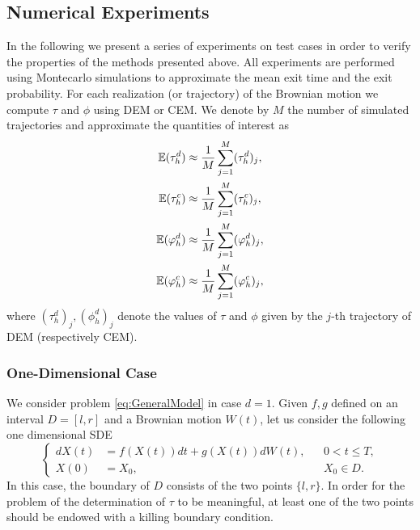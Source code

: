 \subsection{Numerical Experiments}
In the following we present a series of experiments on test cases in order to verify the properties of the methods presented above. All experiments are performed using Montecarlo simulations to approximate the mean exit time and the exit probability. For each realization (or trajectory) of the Brownian motion we compute $\tau$ and $\phi$ using DEM or CEM. We denote by $M$ the number of simulated trajectories and approximate the quantities of interest as
\begin{equation}\label{eq:MonteCarlo}
\begin{aligned}
	\mathbb{E}(\tau_h^d) &\approx \frac{1}{M} \sum_{j=1}^M (\tau_h^d)_j, \\
	\mathbb{E}(\tau_h^c) &\approx \frac{1}{M} \sum_{j=1}^M (\tau_h^c)_j, \\
	\mathbb{E}(\varphi_h^d) &\approx \frac{1}{M} \sum_{j=1}^M (\varphi_h^d)_j, \\	
	\mathbb{E}(\varphi_h^c) &\approx \frac{1}{M} \sum_{j=1}^M (\varphi_h^c)_j, \\	
\end{aligned}
\end{equation}
where $(\tau_h^d)_j, (\phi_h^d)_j$ denote the values of $\tau$ and $\phi$ given by the $j$-th trajectory of DEM (respectively CEM). 
\subsubsection{One-Dimensional Case}
We consider problem \eqref{eq:GeneralModel} in case $d = 1$. Given $f,g$ defined on an interval $D = \left[l,r\right]$ and a Brownian motion $W(t)$, let us consider the following one dimensional SDE
\begin{equation}\label{eq:OneDModel}
\left \{
\begin{aligned}
	dX(t) &= f(X(t)) dt + g(X(t))dW(t), && 0 < t \leq T, \\
	X(0)  &= X_0, && X_0 \in D.
\end{aligned} \right .
\end{equation}
In this case, the boundary of $D$ consists of the two points $\{l,r\}$. In order for the problem of the determination of $\tau$ to be meaningful, at least one of the two points should be endowed with a killing boundary condition. 



